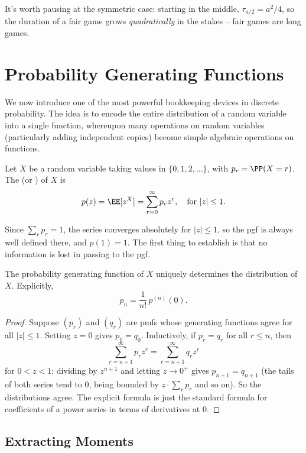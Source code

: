 It's worth pausing at the symmetric case: starting in the middle, $\tau_{a/2} = a^2/4$, so the duration of a fair game grows \emph{quadratically} in the stakes -- fair games are long games.


\section{Probability Generating Functions}

We now introduce one of the most powerful bookkeeping devices in discrete probability. The idea is to encode the entire distribution of a random variable into a single function, whereupon many operations on random variables (particularly adding independent copies) become simple algebraic operations on functions.

\begin{definition}
	Let $X$ be a random variable taking values in $\{0, 1, 2, \dots\}$, with $p_r = \PP(X = r)$. The  (or ) of $X$ is
	$$
	p(z) = \EE[z^X] = \sum_{r = 0}^{\infty} p_r z^r, \quad \text{for } |z| \leq 1.
	$$
\end{definition}

Since $\sum_r p_r = 1$, the series converges absolutely for $|z| \leq 1$, so the pgf is always well defined there, and $p(1) = 1$. The first thing to establish is that no information is lost in passing to the pgf.

\begin{theorem}
	The probability generating function of $X$ uniquely determines the distribution of $X$. Explicitly,
	$$
	p_n = \frac{1}{n!}\, p^{(n)}(0).
	$$
\end{theorem}
\begin{proof}
	Suppose $(p_r)$ and $(q_r)$ are pmfs whose generating functions agree for all $|z| \leq 1$. Setting $z = 0$ gives $p_0 = q_0$. Inductively, if $p_r = q_r$ for all $r \leq n$, then
	$$
	\sum_{r = n + 1}^{\infty} p_r z^r = \sum_{r = n+1}^{\infty} q_r z^r
	$$
	for $0 < z < 1$; dividing by $z^{n + 1}$ and letting $z \rightarrow 0^+$ gives $p_{n + 1} = q_{n+1}$ (the tails of both series tend to $0$, being bounded by $z \cdot \sum_r p_r$ and so on). So the distributions agree. The explicit formula is just the standard formula for coefficients of a power series in terms of derivatives at $0$.
\end{proof}

\subsection{Extracting Moments}

